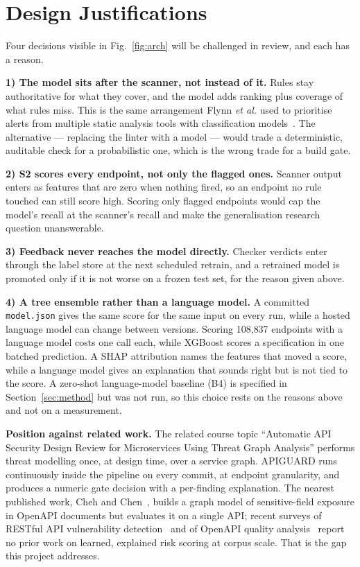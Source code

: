 \documentclass[conference]{IEEEtran}
\begin{document}
\section{Design Justifications}
Four decisions visible in Fig.~\ref{fig:arch} will be challenged in review, and each has a
reason.

\textbf{1) The model sits after the scanner, not instead of it.} Rules stay authoritative for
what they cover, and the model adds ranking plus coverage of what rules miss. This is the same
arrangement Flynn \emph{et al.} used to prioritise alerts from multiple static analysis tools
with classification models~\cite{flynn}. The alternative --- replacing the linter with a model
--- would trade a deterministic, auditable check for a probabilistic one, which is the wrong
trade for a build gate.

\textbf{2) S2 scores every endpoint, not only the flagged ones.} Scanner output enters as
features that are zero when nothing fired, so an endpoint no rule touched can still score
high. Scoring only flagged endpoints would cap the model's recall at the scanner's recall and
make the generalisation research question unanswerable.

\textbf{3) Feedback never reaches the model directly.} Checker verdicts enter through the label
store at the next scheduled retrain, and a retrained model is promoted only if it is not worse on a frozen test set, for the reason given above.

\textbf{4) A tree ensemble rather than a language model.} A committed \texttt{model.json}
gives the same score for the same input on every run, while a hosted language model can change
between versions. Scoring 108{,}837 endpoints with a language model costs one call each, while
XGBoost scores a specification in one batched prediction. A SHAP attribution names the features
that moved a score, while a language model gives an explanation that sounds right but is not
tied to the score. A zero-shot language-model baseline (B4) is specified in Section~\ref{sec:method} but was not run, so this choice rests on the reasons above and not on a measurement.

\textbf{Position against related work.} The related course topic ``Automatic API Security
Design Review for Microservices Using Threat Graph Analysis'' performs threat modelling once,
at design time, over a service graph. APIGUARD runs continuously inside the pipeline on every
commit, at endpoint granularity, and produces a numeric gate decision with a per-finding
explanation. The nearest published work, Cheh and Chen~\cite{cheh}, builds a graph model of
sensitive-field exposure in OpenAPI documents but evaluates it on a single API; recent surveys
of RESTful API vulnerability detection~\cite{tanveer} and of OpenAPI quality
analysis~\cite{oasquali} report no prior work on learned, explained risk scoring at corpus
scale. That is the gap this project addresses.
\end{document}
